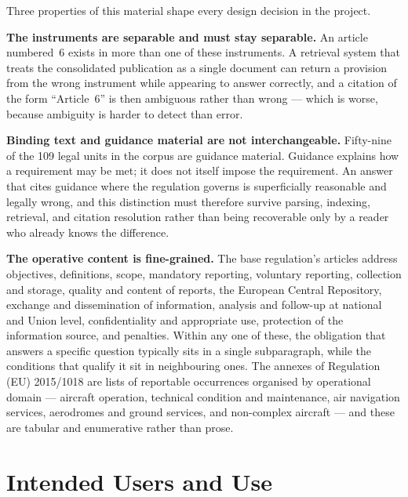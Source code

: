 Three properties of this material shape every design decision in the project.

\textbf{The instruments are separable and must stay separable.} An article numbered~6 exists in more than one of these instruments. A retrieval system that treats the consolidated publication as a single document can return a provision from the wrong instrument while appearing to answer correctly, and a citation of the form ``Article~6'' is then ambiguous rather than wrong --- which is worse, because ambiguity is harder to detect than error.

\textbf{Binding text and guidance material are not interchangeable.} Fifty-nine of the 109 legal units in the corpus are guidance material. Guidance explains how a requirement may be met; it does not itself impose the requirement. An answer that cites guidance where the regulation governs is superficially reasonable and legally wrong, and this distinction must therefore survive parsing, indexing, retrieval, and citation resolution rather than being recoverable only by a reader who already knows the difference.

\textbf{The operative content is fine-grained.} The base regulation's articles address objectives, definitions, scope, mandatory reporting, voluntary reporting, collection and storage, quality and content of reports, the European Central Repository, exchange and dissemination of information, analysis and follow-up at national and Union level, confidentiality and appropriate use, protection of the information source, and penalties. Within any one of these, the obligation that answers a specific question typically sits in a single subparagraph, while the conditions that qualify it sit in neighbouring ones. The annexes of Regulation (EU) 2015/1018 are lists of reportable occurrences organised by operational domain --- aircraft operation, technical condition and maintenance, air navigation services, aerodromes and ground services, and non-complex aircraft --- and these are tabular and enumerative rather than prose.


\section{Intended Users and Use}
\label{sec:context-users}

